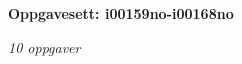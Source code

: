 \centerline{\bf Oppgavesett: i00159no-i00168no}
\vskip 10pt
\centerline{\it 10 oppgaver}\vskip 10pt
\vskip 10pt
